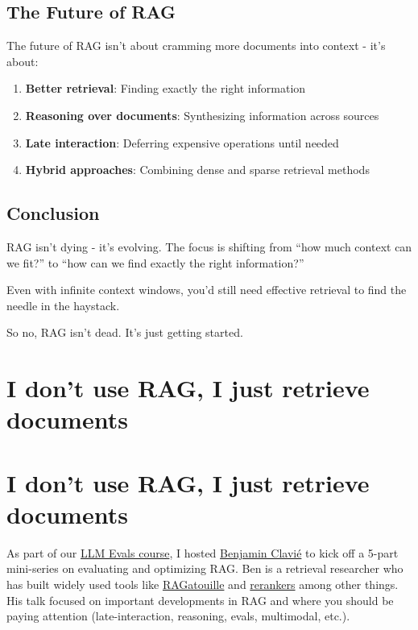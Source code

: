 \documentclass[
  letterpaper,
  oneside]{scrbook}
\providecommand{\tightlist}{%
  \setlength{\itemsep}{0pt}\setlength{\parskip}{0pt}}\usepackage{longtable,booktabs,array}
\begin{document}
\section{The Future of RAG}\label{the-future-of-rag}

The future of RAG isn't about cramming more documents into context -
it's about:

\begin{enumerate}
\def\labelenumi{\arabic{enumi}.}
\tightlist
\item
  \textbf{Better retrieval}: Finding exactly the right information
\item
  \textbf{Reasoning over documents}: Synthesizing information across
  sources
\item
  \textbf{Late interaction}: Deferring expensive operations until needed
\item
  \textbf{Hybrid approaches}: Combining dense and sparse retrieval
  methods
\end{enumerate}

\section{Conclusion}\label{conclusion}

RAG isn't dying - it's evolving. The focus is shifting from ``how much
context can we fit?'' to ``how can we find exactly the right
information?''

Even with infinite context windows, you'd still need effective retrieval
to find the needle in the haystack.

So no, RAG isn't dead. It's just getting started.

\chapter{I don't use RAG, I just retrieve
documents}\label{i-dont-use-rag-i-just-retrieve-documents}

\chapter{I don't use RAG, I just retrieve
documents}\label{i-dont-use-rag-i-just-retrieve-documents-1}

As part of our \href{https://bit.ly/evals-ai}{LLM Evals course}, I
hosted \href{https://ben.clavie.eu/}{Benjamin Clavié} to kick off a
5-part mini-series on evaluating and optimizing RAG. Ben is a retrieval
researcher who has built widely used tools like
\href{https://github.com/answerdotai/ragatouille}{RAGatouille} and
\href{https://github.com/answerdotai/rerankers}{rerankers} among other
things. His talk focused on important developments in RAG and where you
should be paying attention (late-interaction, reasoning, evals,
multimodal, etc.).
\end{document}
